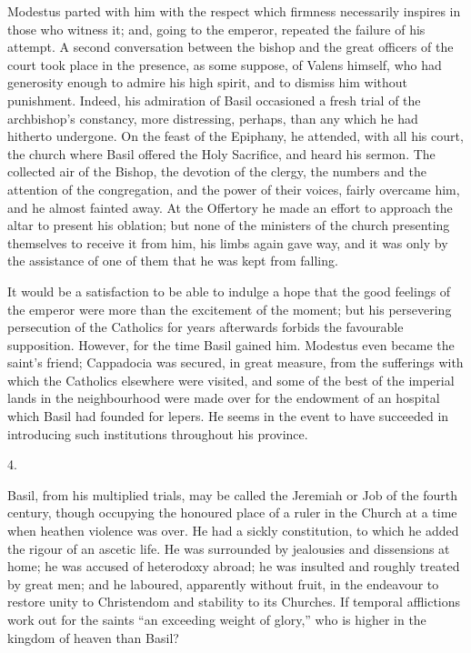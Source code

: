 Modestus parted with him with the respect which firmness
necessarily inspires in those who witness it; and, going to the
emperor, repeated the failure of his attempt. A second conversation
between the bishop and the great officers of the court took place in
the presence, as some suppose, of Valens himself, who had generosity
enough to admire his high spirit, and to dismiss him without
punishment. Indeed, his admiration of Basil occasioned a fresh trial
of the archbishop's constancy, more distressing, perhaps, than any
which he had hitherto undergone. On the feast of the Epiphany, he
attended, with all his court, the church where Basil offered the Holy
Sacrifice, and heard his sermon. The collected air of the Bishop, the
devotion of the clergy, the numbers and the attention of the
congregation, and the power of their voices, fairly overcame him, and
he almost fainted away. At the Offertory he made an effort to approach
the altar to present his oblation; but none of the ministers of the
church presenting themselves to receive it from him, his limbs again
gave way, and it was only by the assistance of one of them that he was
kept from falling.

It would be a satisfaction to be able to indulge a hope that the
good feelings of the emperor were more than the excitement of the
moment; but his persevering persecution of the Catholics for years
afterwards forbids the favourable supposition. However, for the time
Basil gained him. Modestus even became the saint's friend; Cappadocia
was secured, in great measure, from the sufferings with which the
Catholics elsewhere were visited, and some of the best of the imperial
lands in the neighbourhood were made over for the endowment of an hospital which Basil had founded for lepers. He seems in the event to
have succeeded in introducing such institutions throughout his
province.

4.

Basil, from his multiplied trials, may be called the Jeremiah or
Job of the fourth century, though occupying the honoured place of a
ruler in the Church at a time when heathen violence was over. He had a
sickly constitution, to which he added the rigour of an ascetic life.
He was surrounded by jealousies and dissensions at home; he was
accused of heterodoxy abroad; he was insulted and roughly treated by
great men; and he laboured, apparently without fruit, in the endeavour
to restore unity to Christendom and stability to its Churches. If
temporal afflictions work out for the saints ``an exceeding weight
of glory,'' who is higher in the kingdom of heaven than Basil?

